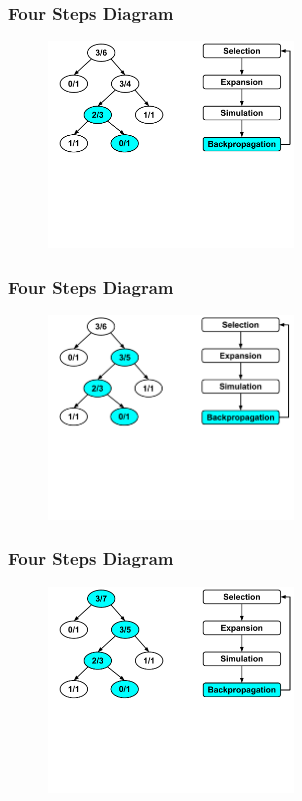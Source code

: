 \documentclass{beamer}
\begin{document}
\begin{frame}[fragile]
\frametitle{Four Steps Diagram}
\begin{figure}[h]
	\includegraphics[width=6.5cm]{Diagrams/MCTSShort/MCTSShortOneFourTwo.pdf}
	\centering
\end{figure}
\end{frame}

\begin{frame}[fragile]
\frametitle{Four Steps Diagram}
\begin{figure}[h]
	\includegraphics[width=6.5cm]{Diagrams/MCTSShort/MCTSShortOneFourThree.pdf}
	\centering
\end{figure}
\end{frame}

\begin{frame}[fragile]
\frametitle{Four Steps Diagram}
\begin{figure}[h]
	\includegraphics[width=6.5cm]{Diagrams/MCTSShort/MCTSShortOneFourFour.pdf}
	\centering
\end{figure}
\end{frame}
\end{document}
